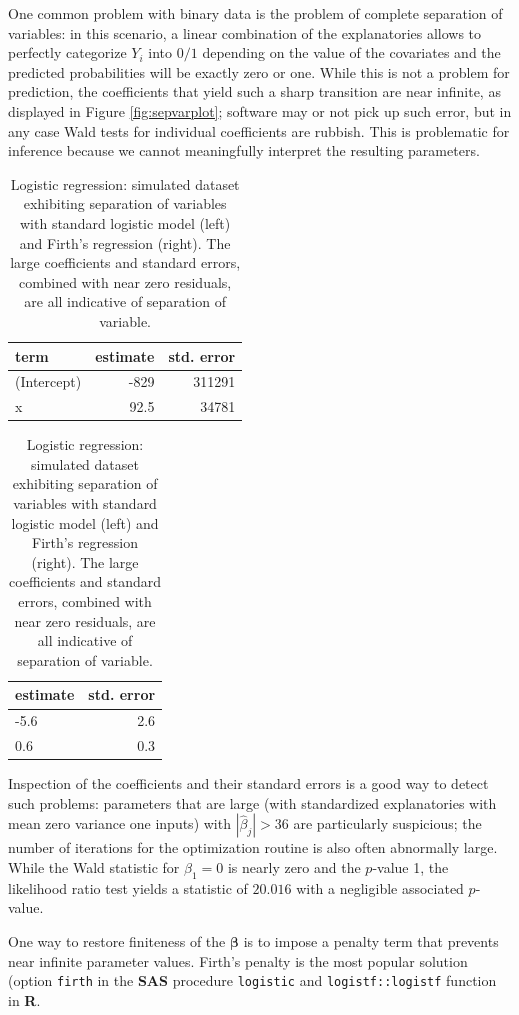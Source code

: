 \documentclass[
  11pt,
  letterpaper,
]{book}
\theoremstyle{definition}
\theoremstyle{definition}
\theoremstyle{definition}
\theoremstyle{definition}
\theoremstyle{remark}
\begin{document}
One common problem with binary data is the problem of complete
separation of variables: in this scenario, a linear combination of the
explanatories allows to perfectly categorize \(Y_i\) into \(0/1\) depending
on the value of the covariates and the predicted probabilities will be
exactly zero or one. While this is not a problem for prediction, the
coefficients that yield such a sharp transition are near infinite, as
displayed in Figure \ref{fig:sepvarplot}; software may or not pick up
such error, but in any case Wald tests for individual coefficients are
rubbish. This is problematic for inference because we cannot
meaningfully interpret the resulting parameters.

\begin{table}
\caption{\label{tab:quasisepvar}Logistic regression: simulated dataset exhibiting separation of variables with standard logistic model (left) and Firth's regression (right). The large coefficients and standard errors, combined with near zero residuals, are all indicative of separation of variable.}

\centering
\begin{tabular}[t]{lrr}
\toprule
term & estimate & std. error\\
\midrule
(Intercept) & -829 & 311291\\
x & 92.5 & 34781\\
\bottomrule
\end{tabular}
\centering
\begin{tabular}[t]{lr}
\toprule
estimate & std. error\\
\midrule
-5.6 & 2.6\\
0.6 & 0.3\\
\bottomrule
\end{tabular}
\end{table}

Inspection of the coefficients and their standard errors is a good way to detect such problems: parameters that are large (with standardized explanatories with mean zero variance one inputs) with \(|\widehat{\beta}_j| > 36\) are particularly suspicious; the number of iterations for the optimization routine is also often abnormally large. While the Wald statistic for \(\beta_1=0\) is nearly zero and the \(p\)-value 1, the likelihood ratio test yields a statistic of \(20.016\) with a negligible associated \(p\)-value.

One way to restore finiteness of the \(\boldsymbol{\beta}\) is to impose a penalty term that prevents near infinite parameter values. Firth's penalty is the most popular solution (option \texttt{firth} in the \textbf{SAS} procedure \texttt{logistic} and \texttt{logistf::logistf} function in \textbf{R}.
\end{document}
